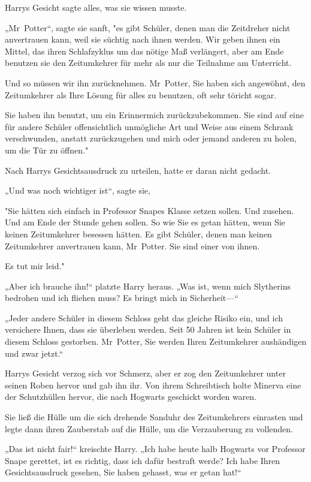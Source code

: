 {Harrys Gesicht sagte alles, was sie wissen musste.

„Mr~Potter“, sagte sie sanft, "es gibt Schüler, denen man die Zeitdreher nicht anvertrauen kann, weil sie süchtig nach ihnen werden. Wir geben ihnen ein Mittel, das ihren Schlafzyklus um das nötige Maß verlängert, aber am Ende benutzen sie den Zeitumkehrer für mehr als nur die Teilnahme am Unterricht.

Und so müssen wir ihn zurücknehmen. Mr~Potter, Sie haben sich angewöhnt, den Zeitumkehrer als Ihre Lösung für alles zu benutzen, oft sehr töricht sogar.

Sie haben ihn benutzt, um ein Erinnermich zurückzubekommen. Sie sind auf eine für andere Schüler offensichtlich unmögliche Art und Weise aus einem Schrank verschwunden, anstatt zurückzugehen und mich oder jemand anderen zu holen, um die Tür zu öffnen."

Nach Harrys Gesichtsausdruck zu urteilen, hatte er daran nicht gedacht.

„Und was noch wichtiger ist“, sagte sie,

"Sie hätten sich einfach in Professor Snapes Klasse setzen sollen. Und zusehen. Und am Ende der Stunde gehen sollen. So wie Sie es getan hätten, wenn Sie keinen Zeitumkehrer besessen hätten. Es gibt Schüler, denen man keinen Zeitumkehrer anvertrauen kann, Mr~Potter. Sie sind einer von ihnen.

Es tut mir leid."

„Aber ich brauche ihn!“ platzte Harry heraus. „Was ist, wenn mich Slytherins bedrohen und ich fliehen muss? Es bringt mich in Sicherheit—“

„Jeder andere Schüler in diesem Schloss geht das gleiche Risiko ein, und ich versichere Ihnen, dass sie überleben werden. Seit 50 Jahren ist kein Schüler in diesem Schloss gestorben. Mr~Potter, Sie werden Ihren Zeitumkehrer aushändigen und zwar jetzt.“

Harrys Gesicht verzog sich vor Schmerz, aber er zog den Zeitumkehrer unter seinen Roben hervor und gab ihn ihr. Von ihrem Schreibtisch holte Minerva eine der Schutzhüllen hervor, die nach Hogwarts geschickt worden waren.

Sie ließ die Hülle um die sich drehende Sanduhr des Zeitumkehrers einrasten und legte dann ihren Zauberstab auf die Hülle, um die Verzauberung zu vollenden.

„Das ist nicht fair!“ kreischte Harry. „Ich habe heute halb Hogwarts vor Professor Snape gerettet, ist es richtig, dass ich dafür bestraft werde? Ich habe Ihren Gesichtsausdruck gesehen, Sie haben gehasst, was er getan hat!“

}
